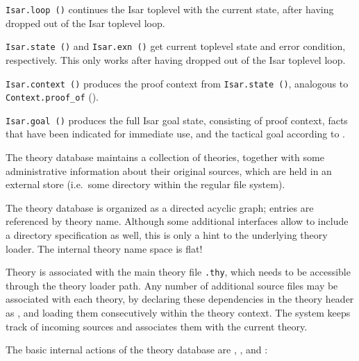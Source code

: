 \begin{isabellebody}
\begin{isamarkuptext}
\begin{description}
  \item \verb|Isar.loop ()| continues the Isar toplevel with the
  current state, after having dropped out of the Isar toplevel loop.

  \item \verb|Isar.state ()| and \verb|Isar.exn ()| get current
  toplevel state and error condition, respectively.  This only works
  after having dropped out of the Isar toplevel loop.

  \item \verb|Isar.context ()| produces the proof context from \verb|Isar.state ()|, analogous to \verb|Context.proof_of|
  ().

  \item \verb|Isar.goal ()| produces the full Isar goal state,
  consisting of proof context, facts that have been indicated for
  immediate use, and the tactical goal according to
  .

  \end{description}%
\end{isamarkuptext}%
\isamarkuptrue%
%
\endisatagmlref
{\isafoldmlref}%
%
\isadelimmlref
%
\endisadelimmlref
%
\isamarkuptrue%
%
\begin{isamarkuptext}%
The theory database maintains a collection of theories, together
  with some administrative information about their original sources,
  which are held in an external store (i.e.\ some directory within the
  regular file system).

  The theory database is organized as a directed acyclic graph;
  entries are referenced by theory name.  Although some additional
  interfaces allow to include a directory specification as well, this
  is only a hint to the underlying theory loader.  The internal theory
  name space is flat!

  Theory  is associated with the main theory file \verb,.thy,, which needs to be accessible through the theory
  loader path.  Any number of additional {\ML} source files may be
  associated with each theory, by declaring these dependencies in the
  theory header as \isa{{\isasymUSES}}, and loading them consecutively
  within the theory context.  The system keeps track of incoming {\ML}
  sources and associates them with the current theory.

  The basic internal actions of the theory database are , , and :


\end{isamarkuptext}
\end{isabellebody}
